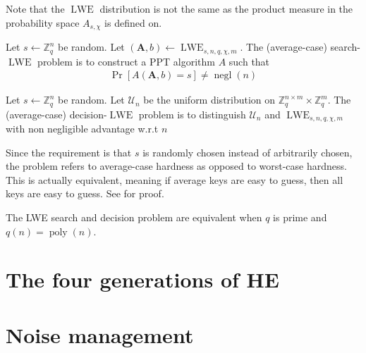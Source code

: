 Note that the $\operatorname{LWE}$ distribution is not the same as the product measure in the probability space $A_{s,\chi}$ is defined on.
\begin{definition}
    Let $s \leftarrow \mathbb{Z}_q^n$ be random.
    Let $(\textbf{A}, b) \leftarrow \operatorname{LWE}_{s, n, q, \chi, m}$. The (average-case) search-$\operatorname{LWE}$ problem is to construct a PPT algorithm $A$ such that
    \begin{equation}
        \begin{aligned}
            \operatorname{Pr}[A(\textbf{A}, b) = s] \neq \operatorname{negl}(n)
        \end{aligned}
    \end{equation}
\end{definition}
\begin{definition}
    Let $s \leftarrow \mathbb{Z}_q^n$ be random.
    Let $\mathcal{U}_n$ be the uniform distribution on $\mathbb{Z}_q^{n \times m} \times \mathbb{Z}_q^m$. The (average-case) decision-$\operatorname{LWE}$ problem is to distinguish $\mathcal{U}_n$ and $\operatorname{LWE}_{s, n, q, \chi, m}$ with non negligible advantage w.r.t $n$
\end{definition}
\begin{remark}
    Since the requirement is that $s$ is randomly chosen instead of arbitrarily chosen, the problem refers to average-case hardness as opposed to worst-case hardness. This is actually equivalent, meaning if average keys are easy to guess, then all keys are easy to guess. See \cite{Reg10} for proof.
\end{remark}
The LWE search and decision problem are equivalent when $q$ is prime and $q(n) = \operatorname{poly}(n)$.

\section{The four generations of HE}

\section{Noise management}

